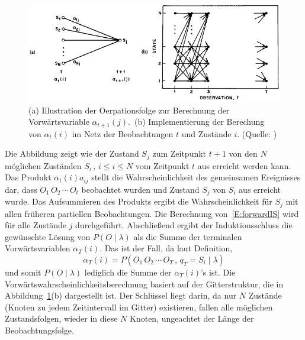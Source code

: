 \begin{figure}[htb]
\centering
\includegraphics[width=\textwidth]{img/markov/forward_variable.png}
\caption[(a) Illustration der Oerpationsfolge zur Berechnung der Vorw\"artsvariable.(b) Implementierung der Berechung von  $\alpha_t(i)$ im Netz der Beobachtungen $t$ und Zust\"ande $i$.]{(a) Illustration der Oerpationsfolge zur Berechnung der Vorw\"artsvariable $\alpha_{t+1}(j)$.~(b) Implementierung der Berechung von $\alpha_t(i)$ im Netz der Beobachtungen $t$ und Zust\"ande $i$. (Quelle: )}
\label{fig:ForwardVariable}
\end{figure}
Die Abbildung zeigt wie der Zustand $S_j$ zum Zeitpunkt $t + 1$ von den $N$ m\"oglichen Zust\"anden $S_i \,,\, i \leq i \leq N$ vom Zeitpunkt $t$ aus erreicht werden kann. Das Produkt $\alpha_t(i) a_{ij}$ stellt die Wahrscheinlichkeit des gemeinsamen Ereignisses dar, dass $O_1 \, O_2 \, \cdots \, O_t$ beobachtet wurden und Zustand $S_j$ von $S_i$ aus erreicht wurde. Das Aufsummieren des Produkts ergibt die Wahrscheinlichkeit f\"ur $S_j$ mit allen fr\"uheren partiellen Beobachtungen. Die Berechnung von~\ref{E:forwardIS} wird f\"ur alle Zust\"ande $j$ durchgef\"uhrt. Abschlie\ss end ergibt der Induktionsschluss die gew\"unschte L\"osung von $P( O \mid \lambda)$ als die Summe der terminalen Vorw\"artsvariablen $\alpha_T(i)$. Das ist der Fall, da laut Definition,
\begin{equation}
\alpha_T(i) = P (O_1 \, O_2 \, \cdots \, O_T \, , \, q_T = S_i \mid \lambda)
\end{equation}
und somit $P (O \mid \lambda)$ lediglich die Summe der $\alpha_T(i)$'s ist.
\newline
Die Vorw\"artswahrscheinlichkeitsberechnung basiert auf der Gitterstruktur, die in Abbildung~\ref{fig:ForwardVariable}(b) dargestellt ist. Der Schl\"ussel liegt darin, da nur $N$ Zust\"ande (Knoten zu jedem Zeitintervall im Gitter) existieren, fallen alle m\"oglichen Zustandsfolgen, wieder in diese $N$ Knoten, ungeachtet der L\"ange der Beobachtungsfolge.
